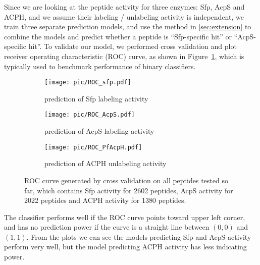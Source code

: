 Since we are looking at the peptide activity for three enzymes: Sfp, AcpS and ACPH, and we assume their labeling / unlabeling activity is independent, we train three separate prediction models, and use the method in \ref{sec:extension} to combine the models and predict whether a peptide is \enquote{Sfp-specific hit} or \enquote{AcpS-specific hit}. To validate our model, we performed cross validation and plot receiver operating characteristic (ROC) curve, as shown in Figure~\ref{fig:ROC}, which is typically used to benchmark performance of binary classifiers. 

\begin{figure}[hpt] 
\center
\begin{subfigure}[b]{0.3\linewidth}
\texttt{[image: pic/ROC\_sfp.pdf]}
\caption{prediction of Sfp labeling activity}
\end{subfigure}
\begin{subfigure}[b]{0.3\linewidth}
\texttt{[image: pic/ROC\_AcpS.pdf]}
\caption{prediction of AcpS labeling activity}
\end{subfigure}
\begin{subfigure}[b]{0.3\linewidth}
\texttt{[image: pic/ROC\_PfAcpH.pdf]}
\caption{prediction of ACPH unlabeling activity}
\end{subfigure}
\caption{ ROC curve generated by cross validation on all peptides tested so far, which contains Sfp activity for 2602 peptides, AcpS activity for 2022 peptides and ACPH activity for 1380 peptides.}
\label{fig:ROC}
\end{figure}

The classifier performs well if the ROC curve points toward upper left corner, and has no prediction power if the curve is a straight line between $(0,0)$ and $(1,1)$. From the plots we can see the models predicting Sfp and AcpS activity perform very well, but the model predicting ACPH activity has less indicating power.


